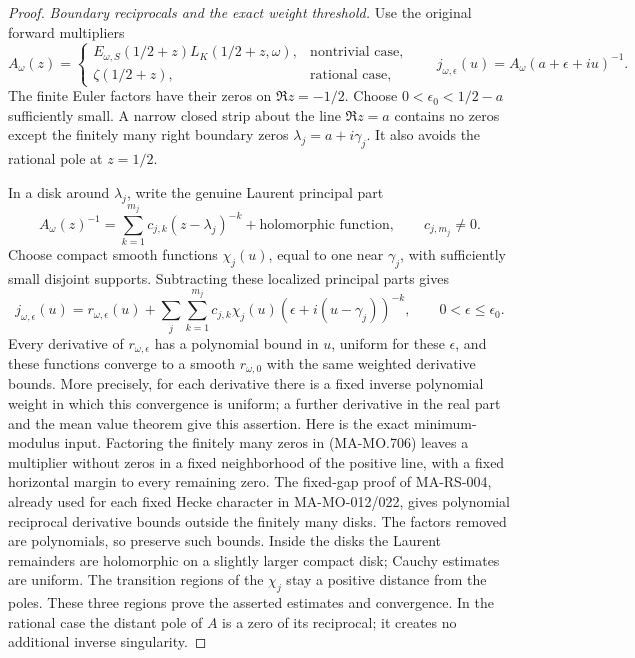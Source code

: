 \begin{proof}
\emph{Boundary reciprocals and the exact weight threshold.}
Use the original forward multipliers
\[
 A_\omega(z)=
 \begin{cases}
 E_{\omega,S}(1/2+z)L_K(1/2+z,\omega),
                           &\text{nontrivial case},\\
 \zeta(1/2+z),              &\text{rational case},
 \end{cases}
 \qquad j_{\omega,\epsilon}(u)=A_\omega(a+\epsilon+iu)^{-1}.
 \tag{MA-MO.705}
\]
The finite Euler factors have their zeros on \(\Re z=-1/2\).
Choose \(0<\epsilon_0<1/2-a\) sufficiently small. A narrow
closed strip about the line \(\Re z=a\) contains no zeros
except the finitely many right boundary zeros
\(\lambda_j=a+i\gamma_j\). It also avoids the rational
pole at \(z=1/2\).

In a disk around \(\lambda_j\), write the genuine Laurent
principal part
\[
 A_\omega(z)^{-1}
       =\sum_{k=1}^{m_j}c_{j,k}(z-\lambda_j)^{-k}
                               +\text{holomorphic function},
               \qquad c_{j,m_j}\ne0 .
 \tag{MA-MO.706}
\]
Choose compact smooth functions \(\chi_j(u)\), equal to
one near \(\gamma_j\), with sufficiently small disjoint
supports. Subtracting these localized principal parts gives
\[
 j_{\omega,\epsilon}(u)=r_{\omega,\epsilon}(u)
    +\sum_j\sum_{k=1}^{m_j}
       c_{j,k}\chi_j(u)(\epsilon+i(u-\gamma_j))^{-k},
                   \qquad 0<\epsilon\le\epsilon_0 .
 \tag{MA-MO.707}
\]
Every derivative of \(r_{\omega,\epsilon}\) has a polynomial
bound in \(u\), uniform for these \(\epsilon\), and these
functions converge to a smooth \(r_{\omega,0}\) with the
same weighted derivative bounds. More precisely, for each
derivative there is a fixed inverse polynomial weight in
which this convergence is uniform; a further derivative
in the real part and the mean value theorem give this
assertion. Here is the exact
minimum-modulus input. Factoring the finitely many zeros
in (MA-MO.706) leaves a multiplier without zeros in a
fixed neighborhood of the positive line, with a fixed
horizontal margin to every remaining zero. The
fixed-gap proof of MA-RS-004, already used for each fixed
Hecke character in MA-MO-012/022, gives polynomial
reciprocal derivative bounds outside the finitely many
disks. The factors removed are polynomials, so preserve
such bounds. Inside the disks the Laurent remainders
are holomorphic on a slightly larger compact disk;
Cauchy estimates are uniform. The transition regions
of the \(\chi_j\) stay a positive distance from the
poles. These three regions prove the asserted estimates
and convergence. In the rational case the distant pole
of \(A\) is a zero of its reciprocal; it creates no
additional inverse singularity.


\end{proof}
